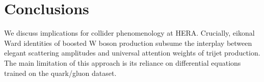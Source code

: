 \section{Conclusions}\label{sec:conclusions}

We discuss implications for collider phenomenology at HERA. Crucially,
eikonal Ward identities of boosted W boson production subsume the
interplay between elegant scattering amplitudes and universal attention
weights of trijet production. The main limitation of this approach is
its reliance on differential equations trained on the quark/gluon
dataset.

